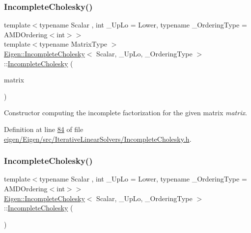 \mbox{\label{class_eigen_1_1_incomplete_cholesky_a757499fc814988a5b112b1f34d0295e1}} 
\subsubsection{\texorpdfstring{Incomplete\+Cholesky()}{IncompleteCholesky()}\hspace{0.1cm}{\footnotesize\ttfamily [2/4]}}
{\footnotesize\ttfamily template$<$typename Scalar , int \+\_\+\+Up\+Lo = Lower, typename \+\_\+\+Ordering\+Type  = A\+M\+D\+Ordering$<$int$>$$>$ \\
template$<$typename Matrix\+Type $>$ \\
\hyperlink{class_eigen_1_1_incomplete_cholesky}{Eigen\+::\+Incomplete\+Cholesky}$<$ Scalar, \+\_\+\+Up\+Lo, \+\_\+\+Ordering\+Type $>$\+::\hyperlink{class_eigen_1_1_incomplete_cholesky}{Incomplete\+Cholesky} (\begin{DoxyParamCaption}\item[{const Matrix\+Type \&}]{matrix }\end{DoxyParamCaption})\hspace{0.3cm}{\ttfamily [inline]}}

Constructor computing the incomplete factorization for the given matrix {\itshape matrix}. 

Definition at line \hyperlink{eigen_2_eigen_2src_2_iterative_linear_solvers_2_incomplete_cholesky_8h_source_l00084}{84} of file \hyperlink{eigen_2_eigen_2src_2_iterative_linear_solvers_2_incomplete_cholesky_8h_source}{eigen/\+Eigen/src/\+Iterative\+Linear\+Solvers/\+Incomplete\+Cholesky.\+h}.

\mbox{\label{class_eigen_1_1_incomplete_cholesky_adaaa3975b8cf53f910d6a3344af92379}} 
\subsubsection{\texorpdfstring{Incomplete\+Cholesky()}{IncompleteCholesky()}\hspace{0.1cm}{\footnotesize\ttfamily [3/4]}}
{\footnotesize\ttfamily template$<$typename Scalar , int \+\_\+\+Up\+Lo = Lower, typename \+\_\+\+Ordering\+Type  = A\+M\+D\+Ordering$<$int$>$$>$ \\
\hyperlink{class_eigen_1_1_incomplete_cholesky}{Eigen\+::\+Incomplete\+Cholesky}$<$ Scalar, \+\_\+\+Up\+Lo, \+\_\+\+Ordering\+Type $>$\+::\hyperlink{class_eigen_1_1_incomplete_cholesky}{Incomplete\+Cholesky} (\begin{DoxyParamCaption}{ }\end{DoxyParamCaption})\hspace{0.3cm}{\ttfamily [inline]}}

